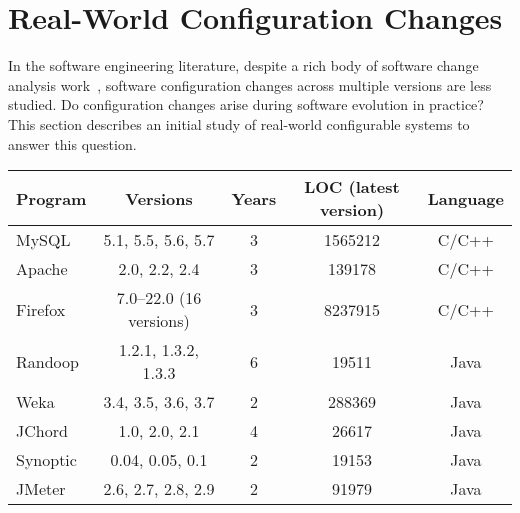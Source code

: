 \section{Real-World Configuration Changes}
\label{sec:study}

In the software engineering literature, despite a rich body of
software change analysis work~\cite{STVR:STVR1475, Dagenais:2008, Tao:2012:SEU}, 
software configuration changes across multiple
versions are less studied. Do configuration
changes arise during software evolution in practice?
This section describes an initial study of
\studysubjnum  real-world configurable systems to answer
this question.



\begin{table}[t]
\vspace{1mm}
\centering
\small{
\setlength{\tabcolsep}{.40\tabcolsep}
\begin{tabular}{|l||c|c|c|c|}
\hline
 Program & Versions & Years & LOC (latest version)  & Language\\
 \hline
 \hline
 MySQL & 5.1, 5.5, 5.6, 5.7 & 3 &1565212& C/C++\\
 Apache& 2.0, 2.2, 2.4 & 3  & 139178 &C/C++\\
 Firefox& 7.0--22.0 (16 versions) & 3  & 8237915&C/C++\\
 Randoop & 1.2.1, 1.3.2, 1.3.3 & 6 & 19511   &Java\\
 Weka & 3.4, 3.5, 3.6, 3.7  & 2  & 288369 &Java\\
 JChord & 1.0, 2.0, 2.1 &  4 & 26617  &Java\\
 Synoptic & 0.04, 0.05, 0.1 & 2   & 19153 &Java\\
 JMeter & 2.6, 2.7, 2.8, 2.9& 2   & 91979 &Java\\
\hline
\end{tabular}
}
\vspace{-2mm}
\end{table}


